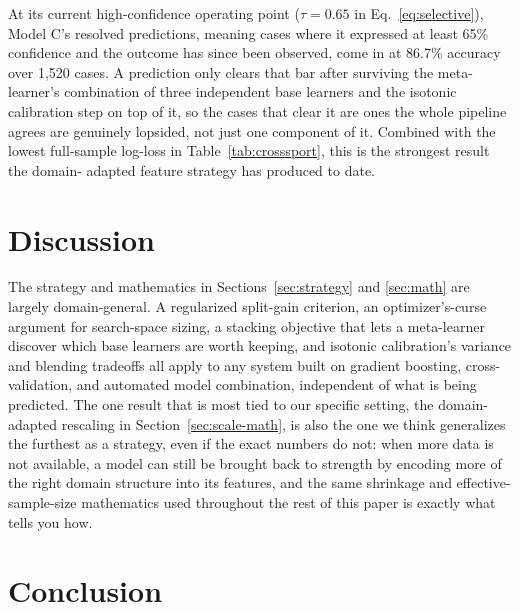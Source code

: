 \documentclass[conference]{IEEEtran}
\begin{document}
At its current high-confidence operating point ($\tau = 0.65$ in
Eq.~\eqref{eq:selective}), Model C's resolved predictions, meaning
cases where it expressed at least 65\% confidence and the outcome has
since been observed, come in at 86.7\% accuracy over 1,520 cases. A
prediction only clears that bar after surviving the meta-learner's
combination of three independent base learners and the isotonic
calibration step on top of it, so the cases that clear it are ones the
whole pipeline agrees are genuinely lopsided, not just one component
of it. Combined with the lowest full-sample log-loss in
Table~\ref{tab:crosssport}, this is the strongest result the domain-
adapted feature strategy has produced to date.

\section{Discussion}
\label{sec:discussion}

The strategy and mathematics in Sections~\ref{sec:strategy} and
\ref{sec:math} are largely domain-general. A regularized split-gain
criterion, an optimizer's-curse argument for search-space sizing, a
stacking objective that lets a meta-learner discover which base
learners are worth keeping, and isotonic calibration's variance and
blending tradeoffs all apply to any system built on gradient boosting,
cross-validation, and automated model combination, independent of what
is being predicted. The one result that is most tied to our specific
setting, the domain-adapted rescaling in
Section~\ref{sec:scale-math}, is also the one we think generalizes the
furthest as a strategy, even if the exact numbers do not: when more
data is not available, a model can still be brought back to strength
by encoding more of the right domain structure into its features, and
the same shrinkage and effective-sample-size mathematics used
throughout the rest of this paper is exactly what tells you how.

\section{Conclusion}
\label{sec:conclusion}
\end{document}
